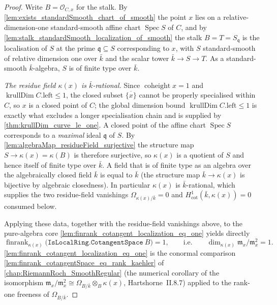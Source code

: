 \begin{proof}
        \leanok
  Write \(B = \mathcal O_{C, x}\) for the stalk.
  By \cref{lem:exists_standardSmooth_chart_of_smooth} the point \(x\) lies on a
  relative-dimension-one standard-smooth affine chart
  \(\operatorname{Spec} S\) of \(C\), and by
  \cref{lem:stalk_standardSmooth_localization_of_smooth} the stalk
  \(B = T = S_{\mathfrak q}\) is the localisation of \(S\) at the prime
  \(\mathfrak q \subseteq S\) corresponding to \(x\), with \(S\) standard-smooth
  of relative dimension one over \(\bar k\) and the scalar tower
  \(\bar k \to S \to T\). As a standard-smooth \(\bar k\)-algebra, \(S\) is of
  finite type over \(\bar k\).

  \emph{The residue field \(\kappa(x)\) is \(\bar k\)-rational.}
  Since \(\operatorname{coheight} x = 1\) and \(\operatorname{krullDim}
  C.\mathrm{left} \le 1\), the closed subset \(\overline{\{x\}}\) cannot be
  properly specialised within \(C\), so \(x\) is a closed point of \(C\);
  the global dimension bound \(\operatorname{krullDim} C.\mathrm{left} \le 1\) is exactly
  what excludes a longer specialisation chain and is supplied by
  \cref{thm:krullDim_curve_le_one}. A closed point of the affine chart
  \(\operatorname{Spec} S\) corresponds to a \emph{maximal} ideal
  \(\mathfrak q\) of \(S\). By
  \cref{lem:algebraMap_residueField_surjective} the structure map
  \(S \to \kappa(x) = \kappa(B)\) is therefore surjective, so \(\kappa(x)\) is a
  quotient of \(S\) and hence itself of finite type over \(\bar k\). A
  field that is of finite type as an algebra over the algebraically closed
  field \(\bar k\) is equal to \(\bar k\)
  (the structure map \(\bar k \to \kappa(x)\) is bijective by algebraic closedness).
  In particular
  \(\kappa(x)\) is \(\bar k\)-rational, which supplies the two residue-field
  vanishings \(\Omega_{\kappa(x)/\bar k} = 0\) and
  \(H^1_{\mathrm{cot}}(\bar k, \kappa(x)) = 0\) consumed below.

  Applying these data, together with
  the residue-field vanishings above, to the pure-algebra core
  \cref{lem:finrank_cotangent_localization_eq_one} yields directly
  \[
    \operatorname{finrank}_{\kappa(x)}
      \bigl(\texttt{IsLocalRing.CotangentSpace}\ B\bigr) = 1,
    \qquad\text{i.e.}\qquad
    \dim_{\kappa(x)} \mathfrak m_x / \mathfrak m_x^2 = 1.
  \]
  \cref{lem:finrank_cotangent_localization_eq_one} is the conormal
  comparison \cref{lem:finrank_cotangentSpace_eq_rank_kaehler} of
  \cref{chap:RiemannRoch_SmoothRegular} (the numerical corollary of the
  isomorphism
  \(\mathfrak m_x/\mathfrak m_x^2 \cong \Omega_{B/\bar k} \otimes_B \kappa(x)\),
  Hartshorne~II.8.7) applied to the rank-one freeness of
  \(\Omega_{B/\bar k}\).
\end{proof}

